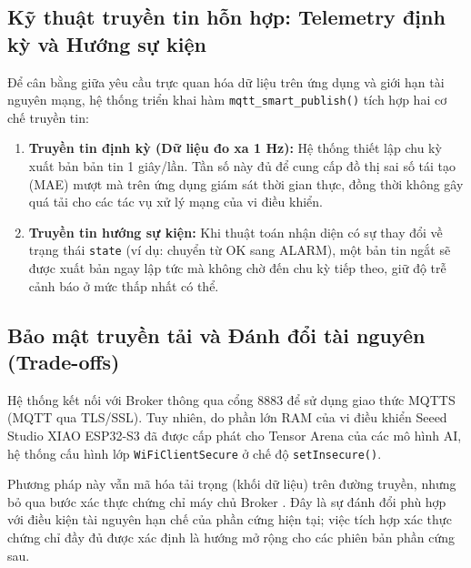 \subsection{Kỹ thuật truyền tin hỗn hợp: Telemetry định kỳ và Hướng sự kiện}
Để cân bằng giữa yêu cầu trực quan hóa dữ liệu trên ứng dụng và giới hạn tài nguyên mạng, hệ thống triển khai hàm \texttt{mqtt\_smart\_publish()} tích hợp hai cơ chế truyền tin:

\begin{enumerate}
    \item \textbf{Truyền tin định kỳ (Dữ liệu đo xa 1 Hz):} Hệ thống thiết lập chu kỳ xuất bản bản tin 1 giây/lần. Tần số này đủ để cung cấp đồ thị sai số tái tạo (MAE) mượt mà trên ứng dụng giám sát thời gian thực, đồng thời không gây quá tải cho các tác vụ xử lý mạng của vi điều khiển.

    \item \textbf{Truyền tin hướng sự kiện:} Khi thuật toán nhận diện có sự thay đổi về trạng thái \texttt{state} (ví dụ: chuyển từ OK sang ALARM), một bản tin ngắt sẽ được xuất bản ngay lập tức mà không chờ đến chu kỳ tiếp theo, giữ độ trễ cảnh báo ở mức thấp nhất có thể.
\end{enumerate}

\subsection{Bảo mật truyền tải và Đánh đổi tài nguyên (Trade-offs)}
Hệ thống kết nối với Broker thông qua cổng 8883 để sử dụng giao thức MQTTS (MQTT qua TLS/SSL). Tuy nhiên, do phần lớn RAM của vi điều khiển Seeed Studio XIAO ESP32-S3 đã được cấp phát cho Tensor Arena của các mô hình AI, hệ thống cấu hình lớp \texttt{WiFiClientSecure} ở chế độ \texttt{setInsecure()}.

Phương pháp này vẫn mã hóa tải trọng (khối dữ liệu) trên đường truyền, nhưng bỏ qua bước xác thực chứng chỉ máy chủ Broker \cite{ref_2_tls_iot}. Đây là sự đánh đổi phù hợp với điều kiện tài nguyên hạn chế của phần cứng hiện tại; việc tích hợp xác thực chứng chỉ đầy đủ được xác định là hướng mở rộng cho các phiên bản phần cứng sau.

